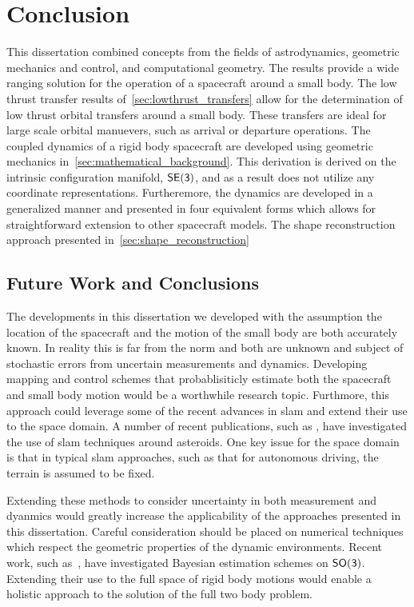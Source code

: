 
\chapter{Conclusion}\label{sec:conclusion}

This dissertation combined concepts from the fields of astrodynamics, geometric mechanics and control, and computational geometry.
The results provide a wide ranging solution for the operation of a spacecraft around a small body.
The low thrust transfer results of~\cref{sec:lowthrust_transfers} allow for the determination of low thrust orbital transfers around a small body. 
These transfers are ideal for large scale orbital manuevers, such as arrival or departure operations.
The coupled dynamics of a rigid body spacecraft are developed using geometric mechanics in~\cref{sec:mathematical_background}.
This derivation is derived on the intrinsic configuration manifold, \( \mathsf{SE(3)} \), and as a result does not utilize any coordinate representations.
Furtheremore, the dynamics are developed in a generalized manner and presented in four equivalent forms which allows for straightforward extension to other spacecraft models.
The shape reconstruction approach presented in~\cref{sec:shape_reconstruction}
\section{Future Work and Conclusions}

The developments in this dissertation we developed with the assumption the location of the spacecraft and the motion of the small body are both accurately known.
In reality this is far from the norm and both are unknown and subject of stochastic errors from uncertain measurements and dynamics. 
Developing mapping and control schemes that probablisiticly estimate both the spacecraft and small body motion would be a worthwhile research topic.
Furthmore, this approach could leverage some of the recent advances in \gls{slam} and extend their use to the space domain.
A number of recent publications, such as \textcite{cocaud2010,cocaud2012,vassallo2015,kulumani2017b}, have investigated the use of \gls{slam} techniques around asteroids.
One key issue for the space domain is that in typical \gls{slam} approaches, such as that for autonomous driving, the terrain is assumed to be fixed.

Extending these methods to consider uncertainty in both measurement and dyanmics would greatly increase the applicability of the approaches presented in this dissertation.
Careful consideration should be placed on numerical techniques which respect the geometric properties of the dynamic environments.
Recent work, such as~\textcite{kulumani2017}, have investigated Bayesian estimation schemes on \( \mathsf{SO(3)} \). 
Extending their use to the full space of rigid body motions would enable a holistic approach to the solution of the full two body problem.


